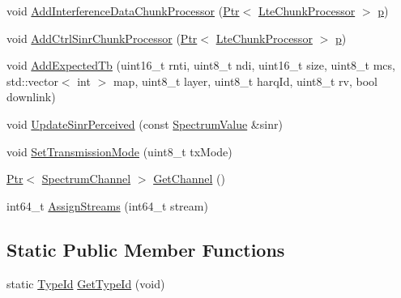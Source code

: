 \begin{DoxyCompactItemize}
\item 
void \hyperlink{classns3_1_1LteSpectrumPhy_a5dc8228013b60da4d0294b843fd2d579}{Add\+Interference\+Data\+Chunk\+Processor} (\hyperlink{classns3_1_1Ptr}{Ptr}$<$ \hyperlink{classns3_1_1LteChunkProcessor}{Lte\+Chunk\+Processor} $>$ \hyperlink{lte__link__budget__x2__handover__measures_8m_ac9de518908a968428863f829398a4e62}{p})
\item 
void \hyperlink{classns3_1_1LteSpectrumPhy_a1b102d2f79f2003a1123d1bdb6e31d29}{Add\+Ctrl\+Sinr\+Chunk\+Processor} (\hyperlink{classns3_1_1Ptr}{Ptr}$<$ \hyperlink{classns3_1_1LteChunkProcessor}{Lte\+Chunk\+Processor} $>$ \hyperlink{lte__link__budget__x2__handover__measures_8m_ac9de518908a968428863f829398a4e62}{p})
\item 
void \hyperlink{classns3_1_1LteSpectrumPhy_a25e4200ac8e92cd6fc819946b9c4aca4}{Add\+Expected\+Tb} (uint16\+\_\+t rnti, uint8\+\_\+t ndi, uint16\+\_\+t size, uint8\+\_\+t mcs, std\+::vector$<$ int $>$ map, uint8\+\_\+t layer, uint8\+\_\+t harq\+Id, uint8\+\_\+t rv, bool downlink)
\item 
void \hyperlink{classns3_1_1LteSpectrumPhy_a81e55daa6bf70765f7e7ff7cca0faed9}{Update\+Sinr\+Perceived} (const \hyperlink{classns3_1_1SpectrumValue}{Spectrum\+Value} \&sinr)
\item 
void \hyperlink{classns3_1_1LteSpectrumPhy_a5979e7e733245f2848549a9d6432abf8}{Set\+Transmission\+Mode} (uint8\+\_\+t tx\+Mode)
\item 
\hyperlink{classns3_1_1Ptr}{Ptr}$<$ \hyperlink{classns3_1_1SpectrumChannel}{Spectrum\+Channel} $>$ \hyperlink{classns3_1_1LteSpectrumPhy_a50f13e43568687ee32c5d63e5bf639c2}{Get\+Channel} ()
\item 
int64\+\_\+t \hyperlink{classns3_1_1LteSpectrumPhy_a662eeb75d0cd0fcbc642c59967b52476}{Assign\+Streams} (int64\+\_\+t stream)
\end{DoxyCompactItemize}
\subsection*{Static Public Member Functions}
\begin{DoxyCompactItemize}
\item 
static \hyperlink{classns3_1_1TypeId}{Type\+Id} \hyperlink{classns3_1_1LteSpectrumPhy_acf8414fd80aca01581e9e3fb37e5d059}{Get\+Type\+Id} (void)
\end{DoxyCompactItemize}
